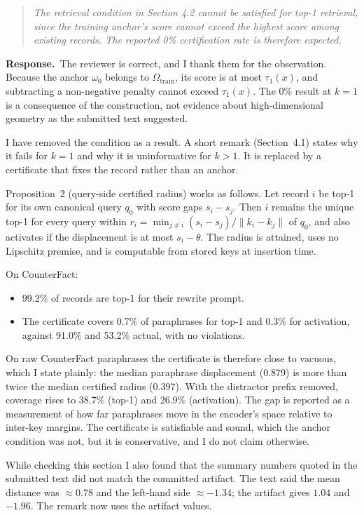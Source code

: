 \documentclass[11pt]{article}
\newenvironment{reviewer}{\par\medskip\noindent\begin{quote}\itshape}{\end{quote}}
\newcommand{\response}{\par\noindent\textbf{Response.}\ }
\begin{document}
\begin{reviewer}
The retrieval condition in Section 4.2 cannot be satisfied for top-1 retrieval, since the training anchor's score cannot exceed the highest score among existing records. The reported 0\% certification rate is therefore expected.
\end{reviewer}

\response The reviewer is correct, and I thank them for the observation. Because the anchor $\omega_0$ belongs to $\Omega_{\mathrm{train}}$, its score is at most $\tau_1(x)$, and subtracting a non-negative penalty cannot exceed $\tau_1(x)$. The 0\% result at $k=1$ is a consequence of the construction, not evidence about high-dimensional geometry as the submitted text suggested.

I have removed the condition as a result. A short remark (Section~4.1) states why it fails for $k=1$ and why it is uninformative for $k>1$. It is replaced by a certificate that fixes the record rather than an anchor.

Proposition~2 (query-side certified radius) works as follows. Let record $i$ be top-1 for its own canonical query $q_0$ with score gaps $s_i-s_j$. Then $i$ remains the unique top-1 for every query within $r_i=\min_{j\ne i}(s_i-s_j)/\|k_i-k_j\|$ of $q_0$, and also activates if the displacement is at most $s_i-\theta$. The radius is attained, uses no Lipschitz premise, and is computable from stored keys at insertion time.

On CounterFact:
\begin{itemize}
\item 99.2\% of records are top-1 for their rewrite prompt.
\item The certificate covers 0.7\% of paraphrases for top-1 and 0.3\% for activation, against 91.0\% and 53.2\% actual, with no violations.
\end{itemize}
On raw CounterFact paraphrases the certificate is therefore close to vacuous, which I state plainly: the median paraphrase displacement (0.879) is more than twice the median certified radius (0.397). With the distractor prefix removed, coverage rises to 38.7\% (top-1) and 26.9\% (activation). The gap is reported as a measurement of how far paraphrases move in the encoder's space relative to inter-key margins. The certificate is satisfiable and sound, which the anchor condition was not, but it is conservative, and I do not claim otherwise.

While checking this section I also found that the summary numbers quoted in the submitted text did not match the committed artifact. The text said the mean distance was $\approx0.78$ and the left-hand side $\approx-1.34$; the artifact gives $1.04$ and $-1.96$. The remark now uses the artifact values.
\end{document}
